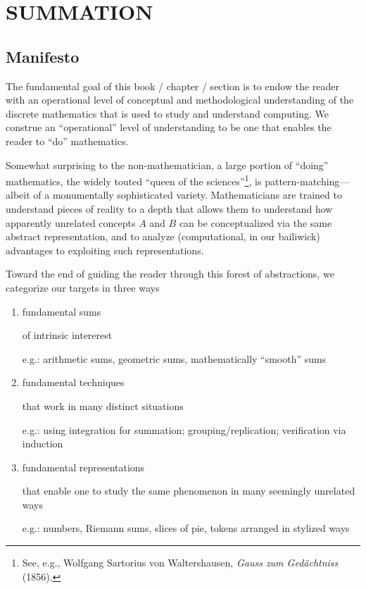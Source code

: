 
\chapter{SUMMATION}
\label{ch:Summation}


\section{Manifesto}
\label{sec:manifesto}

The fundamental goal of this book / chapter / section is to endow the
reader with an operational level of conceptual and methodological
understanding of the discrete mathematics that is used to study and
understand computing.  We construe an ``operational'' level of
understanding to be one that enables the reader to ``do'' mathematics.

Somewhat surprising to the non-mathematician, a large portion of
``doing'' mathematics, the widely touted ``queen of the
sciences''\footnote{See, e.g., Wolfgang Sartorius von Waltershausen,
  {\it Gauss zum Ged\"{a}chtniss} (1856).}, is pattern-matching---albeit
of a monumentally sophisticated variety.  Mathematicians are trained
to understand pieces of reality to a depth that allows them to
understand how apparently unrelated concepts $A$ and $B$ can be
conceptualized via the same abstract representation, and to analyze
(computational, in our bailiwick) advantages to exploiting such
representations.

Toward the end of guiding the reader through this forest of
abstractions, we categorize our targets in three ways
\begin{enumerate}
\item
fundamental sums

of intrinsic intererest

e.g.: arithmetic sums, geometric sums, mathematically ``smooth'' sums

\item
fundamental techniques

that work in many distinct situations

e.g.: using integration for summation; grouping/replication; verification via induction

\item
fundamental representations

that enable one to study the same phenomenon in many seemingly unrelated ways

e.g.: numbers, Riemann sums, slices of pie, tokens arranged in stylized ways
\end{enumerate}

